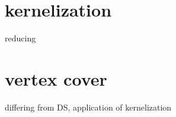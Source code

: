 \documentclass{article}
\begin{document}
\section*{kernelization}
reducing
\section*{vertex cover}
differing from DS, application of kernelization
\end{document}
